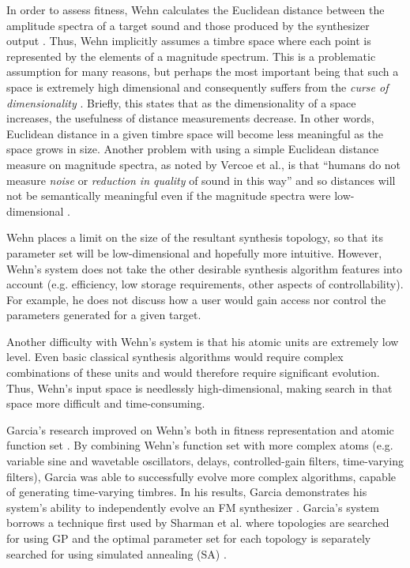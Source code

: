 \documentclass[12pt]{report} 	%
\numberwithin{figure}{chapter}
\numberwithin{table}{chapter}
\numberwithin{equation}{chapter}
\begin{document}
\begin{flushleft}
In order to assess fitness, Wehn calculates the Euclidean distance between the amplitude spectra of a target sound and those produced by the synthesizer output \cite[p. 2]{Wehn:1998bh}. Thus, Wehn implicitly assumes a timbre space where each point is represented by the elements of a magnitude spectrum. This is a problematic assumption for many reasons, but perhaps the most important being that such a space is extremely high dimensional and consequently suffers from the \textit{curse of dimensionality} \cite{Powell:NoRead}. Briefly, this states that as the dimensionality of a space increases, the usefulness of distance measurements decrease. In other words, Euclidean distance in a given timbre space will become less meaningful as the space grows in size. Another problem with using a simple Euclidean distance measure on magnitude spectra, as noted by Vercoe et al., is that ``humans do not measure \textit{noise} or \textit{reduction in quality} of sound in this way'' and so distances will not be semantically meaningful even if the magnitude spectra were low-dimensional \cite[p. 2]{Vercoe:1998hh}.

Wehn places a limit on the size of the resultant synthesis topology, so that its parameter set will be low-dimensional and hopefully more intuitive. However, Wehn's system does not take the other desirable synthesis algorithm features into account (e.g. efficiency, low storage requirements, other aspects of controllability). For example, he does not discuss how a user would gain access nor control the parameters generated for a given target.

Another difficulty with Wehn's system is that his atomic units are extremely low level. Even basic classical synthesis algorithms would require complex combinations of these units and would therefore require significant evolution. Thus, Wehn's input space is needlessly high-dimensional, making search in that space more difficult and time-consuming.

Garcia's research improved on Wehn's both in fitness representation and atomic function set \cite{Garcia:2002cq}. By combining Wehn's function set with more complex atoms (e.g. variable sine and wavetable oscillators, delays, controlled-gain filters, time-varying filters), Garcia was able to successfully evolve more complex algorithms, capable of generating time-varying timbres. In his results, Garcia demonstrates his system's ability to independently evolve an FM synthesizer  \cite[p. 6]{Garcia:2002cq}. Garcia's system borrows a technique first used by Sharman et al. where topologies are searched for using GP and the optimal parameter set for each topology is separately searched for using simulated annealing (SA) \cite{Sharman:1995bs}. 


\end{flushleft}
\end{document}
